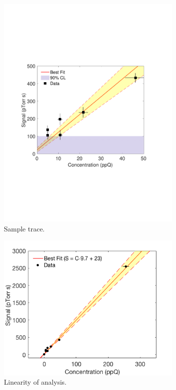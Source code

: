 \documentclass[12pt]{article}
\begin{document}
\begin{figure}[h!]
\centering
\begin{subfigure}{0.5\textwidth}
  \centering
  \includegraphics[width=\textwidth]{Figures/SensPlot0217}
  \caption{Sample  trace.}
\end{subfigure}%
\begin{subfigure}{0.5\textwidth}
  \centering
  \includegraphics[width=\textwidth]{Figures/LinPlot0217.png}
  \caption{Linearity of analysis.}
\end{subfigure}
\caption{}
\label{fig:linplot}
\end{figure}
\end{document}
